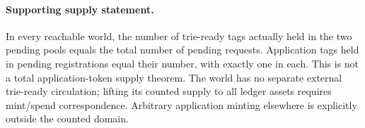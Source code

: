 \paragraph{Supporting supply statement.}
\checked In every reachable world, the number of trie-ready tags actually
held in the two pending pools equals the total number of pending requests.
Application tags held in pending registrations equal their number, with
exactly one in each. This is not a total application-token supply theorem.
The world has no separate external trie-ready circulation; lifting its counted
supply to all ledger assets requires mint/spend correspondence. Arbitrary
application minting elsewhere is explicitly outside the counted domain.
